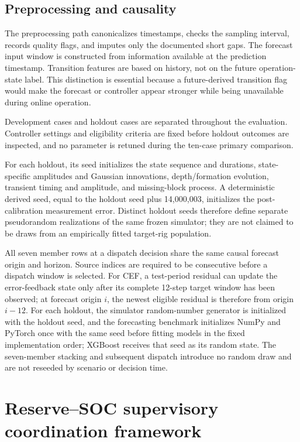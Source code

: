 \subsection{Preprocessing and
causality}\label{preprocessing-and-causality}

The preprocessing path canonicalizes timestamps, checks the sampling
interval, records quality flags, and imputes only the documented short
gaps. The forecast input window is constructed from information
available at the prediction timestamp. Transition features are based on
history, not on the future operation-state label. This distinction is
essential because a future-derived transition flag would make the
forecast or controller appear stronger while being unavailable during
online operation.

Development cases and holdout cases are separated throughout the evaluation.
Controller settings and eligibility criteria are fixed before holdout outcomes
are inspected, and no parameter is retuned during the ten-case primary
comparison.

For each holdout, its seed initializes the state sequence and durations,
state-specific amplitudes and Gaussian innovations, depth/formation evolution,
transient timing and amplitude, and missing-block process. A deterministic
derived seed, equal to the holdout seed plus 14,000,003, initializes the
post-calibration measurement error. Distinct holdout seeds therefore define
separate pseudorandom realizations of the same frozen simulator; they are not
claimed to be draws from an empirically fitted target-rig population.

All seven member rows at a dispatch decision share the same causal forecast
origin and horizon. Source indices are required to be consecutive before a
dispatch window is selected. For CEF, a test-period residual can update the
error-feedback state only after its complete 12-step target window has been
observed; at forecast origin $i$, the newest eligible residual is therefore
from origin $i-12$. For each holdout, the simulator random-number generator is
initialized with the holdout seed, and the forecasting benchmark initializes
NumPy and PyTorch once with the same seed before fitting models in the fixed
implementation order; XGBoost receives that seed as its random state. The
seven-member stacking and subsequent dispatch introduce no random draw and
are not reseeded by scenario or decision time.

\section{Reserve--SOC supervisory coordination
framework}\label{reserve-soc-supervisory-coordination-framework}

